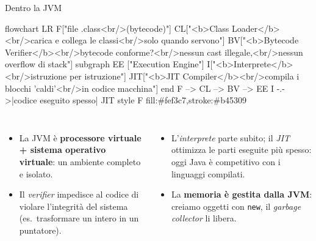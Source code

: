 \documentclass[10pt,aspectratio=169]{beamer}
\begin{document}
\begin{frame}[fragile]{Dentro la JVM}
\begin{mermaid}
flowchart LR
  F["file .class<br/>(bytecode)"]
  CL["<b>Class Loader</b><br/>carica e collega le classi<br/>solo quando servono"]
  BV["<b>Bytecode Verifier</b><br/>bytecode conforme?<br/>nessun cast illegale,<br/>nessun overflow di stack"]
  subgraph EE ["Execution Engine"]
    I["<b>Interprete</b><br/>istruzione per istruzione"]
    JIT["<b>JIT Compiler</b><br/>compila i blocchi 'caldi'<br/>in codice macchina"]
  end
  F --> CL --> BV --> EE
  I -.->|codice eseguito spesso| JIT
  style F fill:#fef3c7,stroke:#b45309
\end{mermaid}

\vspace{0.1cm}
\footnotesize
\begin{columns}[T]
\begin{itemize}\itemsep=2pt
    \item La JVM è \textbf{processore virtuale + sistema operativo virtuale}: un ambiente completo e isolato.
    \item Il \emph{verifier} impedisce al codice di violare l'integrità del sistema (es.\ trasformare un intero in un puntatore).
\end{itemize}
\begin{itemize}\itemsep=2pt
    \item L'\emph{interprete} parte subito; il \emph{JIT} ottimizza le parti eseguite più spesso: oggi Java è competitivo con i linguaggi compilati.
    \item La \textbf{memoria è gestita dalla JVM}: creiamo oggetti con \texttt{new}, il \emph{garbage collector} li libera.
\end{itemize}
\end{columns}
\end{frame}
\end{document}
